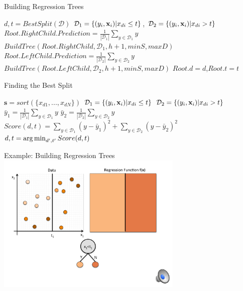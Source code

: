 \documentclass[serif,xcolor=pdftex,dvipsnames,table,hyperref={bookmarks=false,breaklinks}]{beamer}
\begin{document}
\begin{frame}[t]{Building Regression Trees}
\center
\begin{algorithm}[H]
\caption{$BuildTree(Root,\mathcal{D},h,minS,maxD)$}
\begin{algorithmic}
\STATE  $d,t = BestSplit(\mathcal{D})$
\pause\STATE  $\mathcal{D}_1 = \{(y_i,{\mathbf{x}}_i)| x_{di}\leq t\}$, $\mathcal{D}_2 = \{(y_i,{\mathbf{x}}_i)| x_{di} > t\}$
%
\pause{}
\pause  \STATE  $Root.RightChild.Prediction = \frac{1}{|\mathcal{D}_1|}\sum_{y \in \mathcal{D}_1} y$
\pause\ELSE 
\pause \STATE $BuildTree(Root.RightChild, \mathcal{D}_1,h+1,minS,maxD)$
\pause\ENDIF   
%     
\pause{}
\pause  \STATE  $Root.LeftChild.Prediction = \frac{1}{|\mathcal{D}_2|}\sum_{y \in \mathcal{D}_2} y$
\pause\ELSE
\pause  \STATE $BuildTree(Root.LeftChild, \mathcal{D}_2,h+1,minS,maxD)$
\pause\ENDIF 
\pause  \STATE $Root.d=d$,$Root.t=t$
\pause{} 
\end{algorithmic}
\end{algorithm}
\end{frame}



\begin{frame}[t]{Finding the Best Split}
\center
\begin{algorithm}[H]
\caption{$BestSplit(\mathcal{D})$}
\begin{algorithmic}
\pause{}
\pause  \STATE $\mathbf{s} = sort(\{x_{d1},...,x_{dN}\})$
\pause  {}
\pause    \STATE $\mathcal{D}_1 = \{(y_i,{\mathbf{x}}_i)| x_{di}\leq t\}$
\pause    \STATE $\mathcal{D}_2 = \{(y_i,{\mathbf{x}}_i)| x_{di} > t\}$
\pause    \STATE $\bar{y}_1 = \frac{1}{|\mathcal{D}_1|}\sum_{y \in \mathcal{D}_1} y$
\pause    \STATE $\bar{y}_2 = \frac{1}{|\mathcal{D}_2|}\sum_{y \in \mathcal{D}_2} y$
\pause    \STATE $Score(d,t) = \sum_{y \in \mathcal{D}_1} (y-\bar{y}_1)^2 + \sum_{y \in \mathcal{D}_2} (y-\bar{y}_2)^2$
\pause  \ENDFOR
\pause\ENDFOR
\pause\STATE $d,t = \operatorname*{arg\,min}_{d',t'}  Score(d,t)$
\pause{}
\end{algorithmic}
\end{algorithm}
\end{frame}

\begin{frame}[t]{Example: Building Regression Trees}
\center
\includegraphics[page=1,width=3.5in]{../Figures/regression_tree.pdf}
\end{frame}
\end{document}
